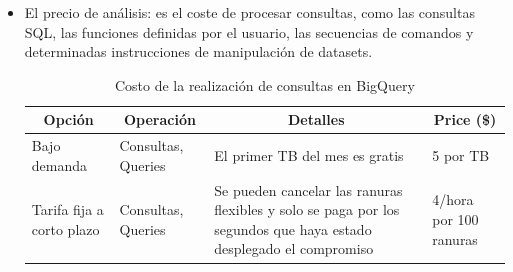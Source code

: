 \documentclass[12pt,a4paper,openright]{article}
\begin{document}
\begin{itemize}
    \item El precio de análisis: es el coste de procesar consultas, como las consultas SQL, las funciones definidas por el usuario, las secuencias de comandos y determinadas instrucciones de manipulación de datasets.
    
    \begin{table}[ht]
    \begin{adjustbox}{width=\textwidth}
\begin{tabular}{|l|l|p{5cm}|l|}
\hline
\multicolumn{1}{|c|}{\textbf{Opción}} & \multicolumn{1}{c|}{\textbf{Operación}} & \multicolumn{1}{c|}{\textbf{Detalles}}                                                                            & \multicolumn{1}{c|}{\textbf{Price (\$)}} \\ \hline
Bajo demanda                          & Consultas, Queries                      & El primer TB del mes es gratis                                                                                    & 5 por TB                                 \\ \hline
Tarifa fija a corto plazo             & Consultas, Queries                      & Se pueden cancelar las ranuras flexibles y solo se paga por los segundos que haya estado desplegado el compromiso & 4/hora por 100 ranuras                   \\ \hline
\end{tabular}
\end{adjustbox}
\caption{Costo de la realizaci\'on de consultas en BigQuery}
\end{table}


\end{itemize}
\end{document}
